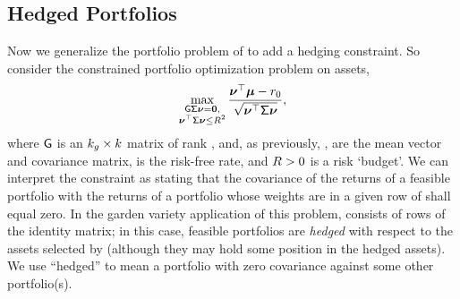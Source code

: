 \documentclass[10pt,a4paper,english]{article}
\theoremstyle{plain}
\theoremstyle{definition}
\theoremstyle{remark}
\begin{document}
\subsection{Hedged Portfolios}%

Now we generalize the portfolio problem of  to add a hedging constraint.
So consider the constrained portfolio optimization problem on \nstrat assets,
\begin{equation}
  \max_{\substack{\hejG\pvsig \pportw = \vzero,\\ \qform{\pvsig}{\pportw} \le \Rbuj^2}}
\frac{\trAB{\pportw}{\pvmu} - \rfr}{\sqrt{\qform{\pvsig}{\pportw}}},
\label{eqn:opt_port_hedge}
\end{equation}
where $\mathsf{G}$ is an $\nstrathej \times \nstrat$ matrix of rank \nstrathej, and,
as previously, \pvmu, \pvsig are the mean vector and covariance matrix, 
\rfr is the risk-free rate, and $\Rbuj > 0$ is a risk `budget'. 
We can interpret
the \hejG constraint as stating that the covariance of the returns of
a feasible portfolio with the returns of a portfolio whose weights are in
a given row of \hejG shall equal zero. %
In the garden variety application of this problem, \hejG consists of 
\nstrathej rows of the identity matrix; %
in this case, feasible portfolios are \emph{hedged} with respect 
to the \nstrathej assets selected by \hejG
(although they may hold some position in the hedged assets).
We use ``hedged'' to mean a portfolio with zero covariance 
against some other portfolio(s).
\end{document}
